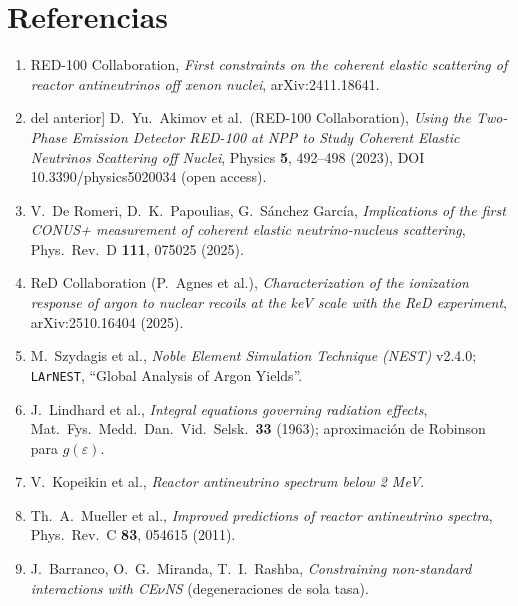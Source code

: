 \documentclass[11pt,a4paper]{article}
\newcommand{\eps}{\varepsilon}
\newcommand{\code}[1]{\texttt{#1}}
\begin{document}
\section*{Referencias}
\begin{enumerate}
  \item RED-100 Collaboration, \emph{First constraints on the coherent elastic
    scattering of reactor antineutrinos off xenon nuclei}, arXiv:2411.18641.
  \item [ref.\ [46] del anterior] D.\ Yu.\ Akimov et al.\ (RED-100
    Collaboration), \emph{Using the Two-Phase Emission Detector RED-100 at NPP
    to Study Coherent Elastic Neutrinos Scattering off Nuclei}, Physics
    \textbf{5}, 492--498 (2023), DOI 10.3390/physics5020034 (open access).
  \item V.\ De Romeri, D.\ K.\ Papoulias, G.\ S\'anchez Garc\'ia,
    \emph{Implications of the first CONUS+ measurement of coherent elastic
    neutrino-nucleus scattering}, Phys.\ Rev.\ D \textbf{111}, 075025 (2025).
  \item ReD Collaboration (P.\ Agnes et al.), \emph{Characterization of the
    ionization response of argon to nuclear recoils at the keV scale with the
    ReD experiment}, arXiv:2510.16404 (2025).
  \item M.\ Szydagis et al., \emph{Noble Element Simulation Technique (NEST)}
    v2.4.0; \code{LArNEST}, ``Global Analysis of Argon Yields''.
  \item J.\ Lindhard et al., \emph{Integral equations governing radiation
    effects}, Mat.\ Fys.\ Medd.\ Dan.\ Vid.\ Selsk.\ \textbf{33} (1963);
    aproximaci\'on de Robinson para $g(\eps)$.
  \item V.\ Kopeikin et al., \emph{Reactor antineutrino spectrum below 2 MeV}.
  \item Th.\ A.\ Mueller et al., \emph{Improved predictions of reactor
    antineutrino spectra}, Phys.\ Rev.\ C \textbf{83}, 054615 (2011).
  \item J.\ Barranco, O.\ G.\ Miranda, T.\ I.\ Rashba,
    \emph{Constraining non-standard interactions with CE$\nu$NS}
    (degeneraciones de sola tasa).
\end{enumerate}
\end{document}
